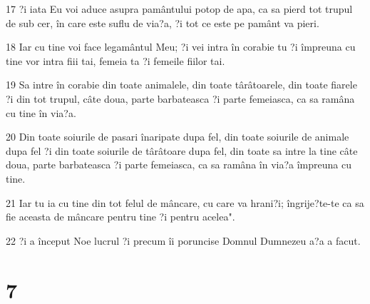 \par 17 ?i iata Eu voi aduce asupra pamântului potop de apa, ca sa pierd tot trupul de sub cer, în care este suflu de via?a, ?i tot ce este pe pamânt va pieri.
\par 18 Iar cu tine voi face legamântul Meu; ?i vei intra în corabie tu ?i împreuna cu tine vor intra fiii tai, femeia ta ?i femeile fiilor tai.
\par 19 Sa intre în corabie din toate animalele, din toate târâtoarele, din toate fiarele ?i din tot trupul, câte doua, parte barbateasca ?i parte femeiasca, ca sa ramâna cu tine în via?a.
\par 20 Din toate soiurile de pasari înaripate dupa fel, din toate soiurile de animale dupa fel ?i din toate soiurile de târâtoare dupa fel, din toate sa intre la tine câte doua, parte barbateasca ?i parte femeiasca, ca sa ramâna în via?a împreuna cu tine.
\par 21 Iar tu ia cu tine din tot felul de mâncare, cu care va hrani?i; îngrije?te-te ca sa fie aceasta de mâncare pentru tine ?i pentru acelea".
\par 22 ?i a început Noe lucrul ?i precum îi poruncise Domnul Dumnezeu a?a a facut.

\chapter{7}

